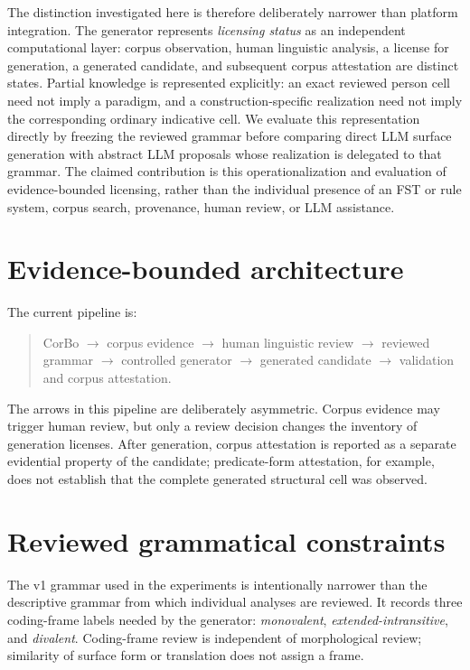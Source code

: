 \documentclass[11pt]{article}
\begin{document}
The distinction investigated here is therefore deliberately narrower than
platform integration. The generator represents \emph{licensing status} as an
independent computational layer: corpus observation, human linguistic analysis,
a license for generation, a generated candidate, and subsequent corpus
attestation are distinct states. Partial knowledge is represented explicitly:
an exact reviewed person cell need not imply a paradigm, and a
construction-specific realization need not imply the corresponding ordinary
indicative cell. We evaluate this representation directly by freezing the
reviewed grammar before comparing direct LLM surface generation with abstract
LLM proposals whose realization is delegated to that grammar. The claimed
contribution is this operationalization and evaluation of evidence-bounded
licensing, rather than the individual presence of an FST or rule system,
corpus search, provenance, human review, or LLM assistance.

\section{Evidence-bounded architecture}
\label{sec:architecture}

The current pipeline is:

\begin{quote}
CorBo $\rightarrow$ corpus evidence $\rightarrow$ human linguistic review
$\rightarrow$ reviewed grammar $\rightarrow$ controlled generator
$\rightarrow$ generated candidate $\rightarrow$ validation and corpus
attestation.
\end{quote}

The arrows in this pipeline are deliberately asymmetric. Corpus evidence may
trigger human review, but only a review decision changes the inventory of
generation licenses. After generation, corpus attestation is reported as a
separate evidential property of the candidate; predicate-form attestation, for
example, does not establish that the complete generated structural cell was
observed.

\section{Reviewed grammatical constraints}
\label{sec:grammar}

The v1 grammar used in the experiments is intentionally narrower than the
descriptive grammar from which individual analyses are reviewed. It records
three coding-frame labels needed by the generator: \emph{monovalent},
\emph{extended-intransitive}, and \emph{divalent}. Coding-frame review is
independent of morphological review; similarity of surface form or translation
does not assign a frame.
\end{document}
